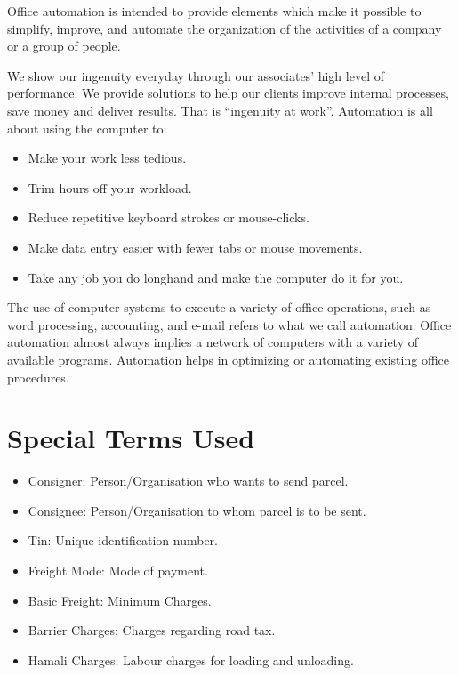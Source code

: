 Office automation is intended to provide elements which make it possible to simplify, improve,
and automate the organization of the activities of a company or a group of people.

We show our ingenuity everyday through our associates’ high level of performance. We provide
solutions to help our clients improve internal processes, save money and deliver results. That is
“ingenuity at work”.
Automation is all about using the computer to:
\begin{itemize}
\item Make your work less tedious.
\item Trim hours off your workload.
\item Reduce repetitive keyboard strokes or mouse-clicks.
\item Make data entry easier with fewer tabs or mouse movements.
\item Take any job you do longhand and make the computer do it for you.
\end{itemize}
The use of computer systems to execute a variety of office operations, such as word processing,
accounting, and e-mail refers to what we call automation. Office automation almost always implies
a network of computers with a variety of available programs. Automation helps in optimizing or
automating existing office procedures.

\section{Special Terms Used}
\begin{itemize}
\item Consigner: Person/Organisation who wants to send parcel.
\item Consignee: Person/Organisation to whom parcel is to be sent.
\item Tin: Unique identification number.
\item Freight Mode: Mode of payment.
\item Basic Freight: Minimum Charges.
\item Barrier Charges: Charges regarding road tax.
\item Hamali Charges: Labour charges for loading and unloading.
\end{itemize} 
